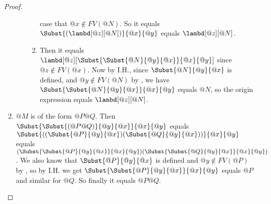 \documentclass[../../../include/open-logic-section]{subfiles}
\begin{document}
\begin{proof}
\begin{enumerate}
\begin{enumerate}
\begin{enumerate}
                case that $@x \notin FV(@N)$. So it equals
                $\Subst{(\lambd[@z][@N])}{@x}{@y}$ equals
                $\lambd[@z][@N]$.
              \item[$@y \neq @z$] Then it equals
                $\lambd[@z][\Subst{\Subst{@N}{@y}{@x}}{@x}{@y}]$ since
                $@z \notin FV(@x)$. Now by I.H., since
                $\Subst{@N}{@y}{@x}$ is defined, and $@y \notin
                FV(@N)$ by , we have
                $\Subst{\Subst{@N}{@y}{@x}}{@x}{@y}$ equals $@N$, so
                the origin expression equals $\lambd[@z][@N]$.
              \end{enumerate} 
      \end{enumerate}
      \item[\rule{APP}] $@M$ is of the form $@P@Q$. Then
        $\Subst{\Subst{(@P@Q)}{@y}{@x}}{@x}{@y}$ equals
        $\Subst{((\Subst{@P}{@y}{@x})(\Subst{@Q}{@y}{@x}))}{@x}{@y}$ equals
        $(\Subst{\Subst{@P}{@y}{@x}}{@x}{@y})(\Subst{\Subst{@Q}{@y}{@x}}{@x}{@y})$.
        We also know that $\Subst{@P}{@y}{@x}$ is defined and $@y
        \notin FV(@P)$ by \olref[fv][app], so by I.H. we get
        $\Subst{\Subst{@P}{@y}{@x}}{@x}{@y}$ equals $@P$ and similar
        for $@Q$. So finally it equals $@P@Q$.
  \end{enumerate}
\end{proof}
\end{document}
